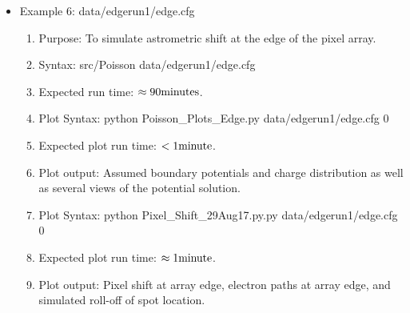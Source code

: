 \documentclass{article} %
\begin{document}
\begin{itemize}
  \item Example 6: data/edgerun1/edge.cfg
    \begin{enumerate}
      \item Purpose: To simulate astrometric shift at the edge of the pixel array.
      \item Syntax: src/Poisson data/edgerun1/edge.cfg
      \item Expected run time: $\rm \approx 90 minutes$.
      \item Plot Syntax: python Poisson\_Plots\_Edge.py data/edgerun1/edge.cfg 0
      \item Expected plot run time: $\rm <1 minute$.
      \item Plot output: Assumed boundary potentials and charge distribution as well as several views of the potential solution. 
      \item Plot Syntax: python Pixel\_Shift\_29Aug17.py.py data/edgerun1/edge.cfg 0 
      \item Expected plot run time: $\rm \approx 1 minute$.
      \item Plot output: Pixel shift at array edge, electron paths at array edge, and simulated roll-off of spot location.
    \end{enumerate}

    
\end{itemize}
\end{document}

